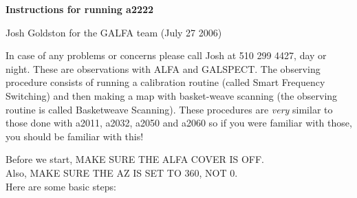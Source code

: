 \setlength{\textheight}{21.5cm}
\setlength{\textwidth}{7in}
\setlength{\topmargin}{-0.25in}
\setlength{\oddsidemargin}{-0.25in}
\setlength{\evensidemargin}{0mm}
\setlength{\parindent}{0em}
\setlength{\headsep}{10.0mm}

\def\baselinestretch{1.0}
\pagestyle{myheadings}
\def\kms{km~s$^{-1}$}


\parskip 5pt
\begin{center}
  {\Large \bf Instructions for running a2222}

\vspace{0.5cm} {\large Josh Goldston for the GALFA team (July 27 2006)}
\end{center}

In case of any problems or concerns please call Josh at 510 299 4427, day or night.
These are observations with ALFA and GALSPECT. The observing procedure
consists of running a calibration routine (called Smart Frequency
Switching) and then making a map with basket-weave scanning (the observing
routine is called Basketweave Scanning). These procedures are {\it very} similar to 
those done with a2011, a2032, a2050 and a2060 so if you were familiar with those, you
should be familiar with this! 

Before we start, MAKE SURE THE ALFA COVER IS OFF.\\
Also, MAKE SURE THE AZ IS SET TO 360, NOT 0.\\
Here are some basic steps:

